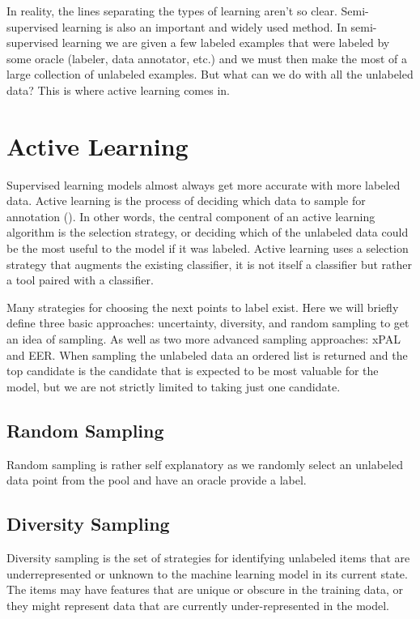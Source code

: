 In reality, the lines separating the types of learning aren't so clear. Semi-supervised learning is also an important and widely used method. In semi-supervised learning we are given a few labeled examples that were labeled by some oracle (labeler, data annotator, etc.) and we must then make the most of a large collection of unlabeled examples. But what can we do with all the unlabeled data? This is where active learning comes in.



\section{Active Learning}
Supervised learning models almost always get more accurate with more labeled data. Active learning is the process of deciding which data to sample for annotation (\cite{munro2021human}). In other words, the central component of an active learning algorithm is the selection strategy, or deciding which of the unlabeled data could be the most useful to the model if it was labeled. Active learning uses a selection strategy that augments the existing classifier, it is not itself a classifier but rather a tool paired with a classifier.

Many strategies for choosing the next points to label exist. Here we will briefly define three basic approaches: uncertainty, diversity, and random sampling to get an idea of sampling. As well as two more advanced sampling approaches: xPAL and EER. When sampling the unlabeled data an ordered list is returned and the top candidate is the candidate that is expected to be most valuable for the model, but we are not strictly limited to taking just one candidate.

\subsection{Random Sampling}
Random sampling is rather self explanatory as we randomly select an unlabeled data point from the pool and have an oracle provide a label.

\subsection{Diversity Sampling}
Diversity sampling is the set of strategies for identifying unlabeled items that are underrepresented or unknown to the machine learning model in its current state. The items may have features that are unique or obscure in the training data, or they might represent data that are currently under-represented in the model. 

